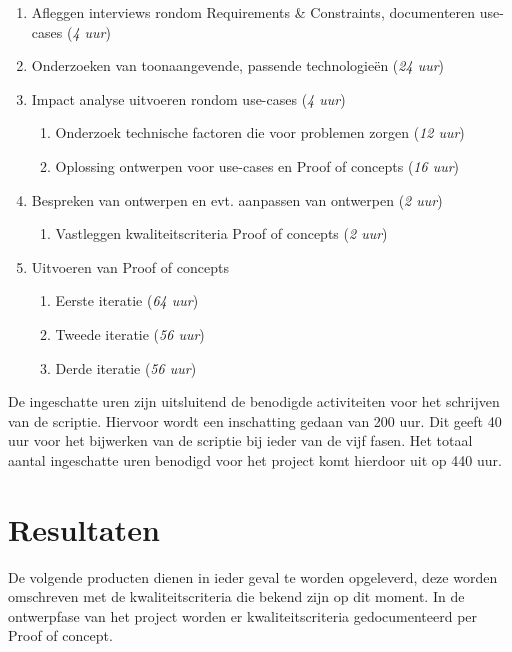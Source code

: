 \begin{enumerate}
    \item Afleggen interviews rondom Requirements \& Constraints, documenteren use-cases  (\textit{4 uur})
    \item Onderzoeken van toonaangevende, passende technologieën (\textit{24 uur})
    \item Impact analyse uitvoeren rondom use-cases (\textit{4 uur})
    \begin{enumerate}
        \item Onderzoek technische factoren die voor problemen zorgen (\textit{12 uur})
        \item Oplossing ontwerpen voor use-cases en Proof of concepts (\textit{16 uur})
    \end{enumerate}
    \item Bespreken van ontwerpen en evt. aanpassen van ontwerpen (\textit{2 uur})
    \begin{enumerate}
        \item Vastleggen kwaliteitscriteria Proof of concepts (\textit{2 uur})
    \end{enumerate}
    \item Uitvoeren van Proof of concepts
    \begin{enumerate}
        \item Eerste iteratie (\textit{64 uur})
        \item Tweede iteratie (\textit{56 uur})
        \item Derde iteratie (\textit{56 uur})
    \end{enumerate}
\end{enumerate}


De ingeschatte uren zijn uitsluitend de benodigde activiteiten voor het schrijven van de scriptie. Hiervoor wordt een inschatting gedaan van 200 uur. Dit geeft 40 uur voor het bijwerken van de scriptie bij ieder van de vijf fasen. Het totaal aantal ingeschatte uren benodigd voor het project komt hierdoor uit op 440 uur.

\clearpage

\section{Resultaten}

De volgende producten dienen in ieder geval te worden opgeleverd, deze worden omschreven met de kwaliteitscriteria die bekend zijn op dit moment. In de ontwerpfase van het project worden er kwaliteitscriteria gedocumenteerd per Proof of concept.

